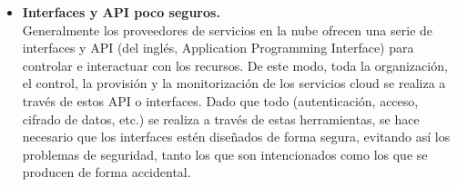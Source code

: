 \begin{itemize}
	\item \textbf {Interfaces y API poco seguros. } \\ Generalmente los proveedores de servicios en la nube ofrecen una serie de interfaces y API (del inglés, Application Programming Interface) para controlar e interactuar con los recursos. De este modo, toda la organización, el control, la provisión y la monitorización de los servicios cloud se realiza a través de estos API o interfaces. 
Dado que todo (autenticación, acceso, cifrado de datos, etc.) se realiza a través de estas herramientas, se hace necesario que los interfaces estén diseñados de forma segura, evitando así los problemas de seguridad, tanto los que son intencionados como los que se producen de forma accidental. 

\end{itemize}
